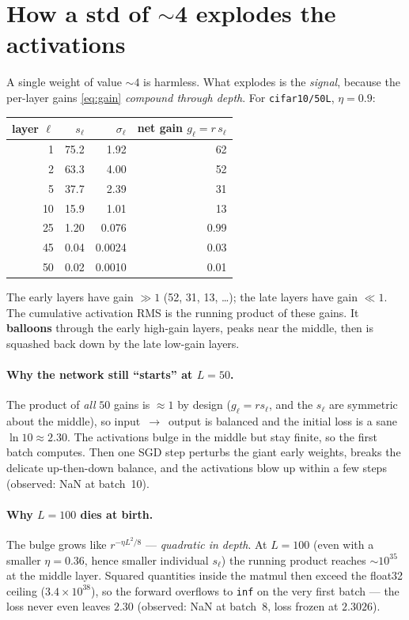\documentclass[11pt]{article}
\begin{document}
\section{How a std of $\sim$4 explodes the activations}

A single weight of value $\sim 4$ is harmless. What explodes is the \emph{signal},
because the per-layer gains \eqref{eq:gain} \emph{compound through depth}. For
\texttt{cifar10/50L}, $\eta=0.9$:

\begin{center}
\begin{tabular}{rrrr}
\toprule
layer $\ell$ & $s_\ell$ & $\sigma_\ell$ & net gain $g_\ell=r\,s_\ell$ \\
\midrule
1  & 75.2 & 1.92 & 62 \\
2  & 63.3 & 4.00 & 52 \\
5  & 37.7 & 2.39 & 31 \\
10 & 15.9 & 1.01 & 13 \\
25 &  1.20 & 0.076 & 0.99 \\
45 &  0.04 & 0.0024 & 0.03 \\
50 &  0.02 & 0.0010 & 0.01 \\
\bottomrule
\end{tabular}
\end{center}

The early layers have gain $\gg 1$ (52, 31, 13, \dots); the late layers have gain
$\ll 1$. The cumulative activation RMS is the running product of these gains. It
\textbf{balloons} through the early high-gain layers, peaks near the middle, then is
squashed back down by the late low-gain layers.

\paragraph{Why the network still ``starts'' at $L=50$.} The product of \emph{all}
$50$ gains is $\approx 1$ by design ($g_\ell = r s_\ell$, and the $s_\ell$ are
symmetric about the middle), so input~$\to$~output is balanced and the initial loss
is a sane $\ln 10 \approx 2.30$. The activations bulge in the middle but stay finite,
so the first batch computes. Then one SGD step perturbs the giant early weights,
breaks the delicate up-then-down balance, and the activations blow up within a few
steps (observed: NaN at batch~10).

\paragraph{Why $L=100$ dies at birth.} The bulge grows like
$r^{-\eta L^2/8}$ --- \emph{quadratic in depth}. At $L=100$ (even with a smaller
$\eta=0.36$, hence smaller individual $s_\ell$) the running product reaches
$\sim 10^{35}$ at the middle layer. Squared quantities inside the matmul then exceed
the float32 ceiling ($3.4\times10^{38}$), so the forward overflows to \texttt{inf} on
the very first batch --- the loss never even leaves $2.30$ (observed: NaN at batch~8,
loss frozen at $2.3026$).
\end{document}
